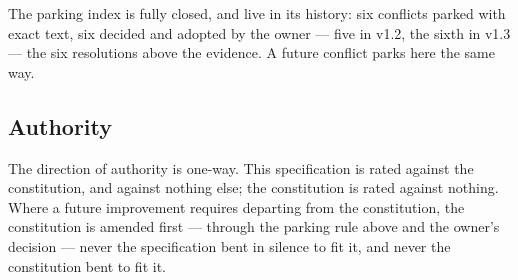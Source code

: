 \documentclass[11pt,a4paper]{article}
\begin{document}
\noindent The parking index is fully closed, and live in its history: six conflicts
parked with exact text, six decided and adopted by the owner --- five in v1.2, the sixth
in v1.3 --- the six resolutions above the evidence. A future conflict parks here the same
way.

\subsection{Authority}

The direction of authority is one-way. This specification is rated against the
constitution, and against nothing else; the constitution is rated against nothing. Where a
future improvement requires departing from the constitution, the constitution is amended
first --- through the parking rule above and the owner's decision --- never the
specification bent in silence to fit it, and never the constitution bent to fit it.
\end{document}
